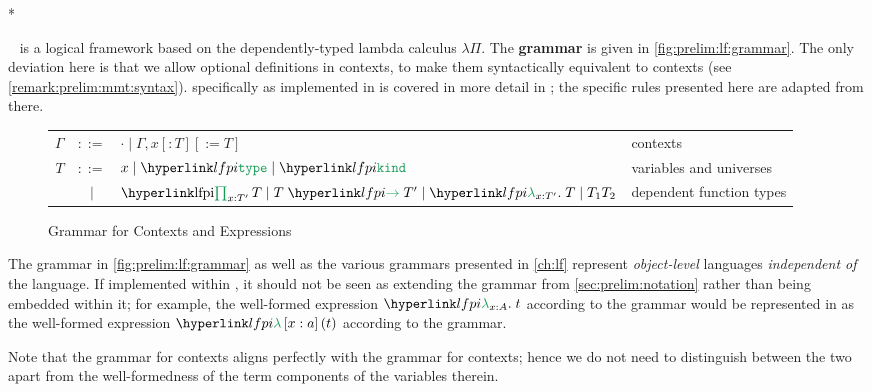 \lstMakeShortInline[language=scala]*

\LF~\cite{lf} is a logical framework based on the dependently-typed lambda calculus $\lambda\Pi$. \hypertarget{lfpi}{The \textbf{grammar} is given in \autoref{fig:prelim:lf:grammar}}.
The only deviation here is that we allow optional definitions in contexts, to make them syntactically equivalent to \mmt contexts (see \autoref{remark:prelim:mmt:syntax}). \LF specifically as implemented in \mmt is covered in more detail in \cite{rabe:recon:17}; the specific rules presented here are adapted from there.

\begin{figure}[ht]%
  \begin{framed}
      \begin{tabular}{rcl@{\quad}l}
        $\Gamma$ & $::=$ & $\cdot \mid \Gamma, x[:T][:=T]$ & contexts\\
	  	   $T$ & $::=$ & $x \mid \type \mid \kind $ & variables and universes\\
       		    & $\mid$ & $\lfpi{x:T'}T \mid \lfarrow{T}{T'} \mid \lflambda{x:T'}T \mid T_1 T_2$ & dependent function types
      \end{tabular}
\end{framed}
  \caption{Grammar for Contexts and Expressions}\label{fig:prelim:lf:grammar}%
\end{figure}

The grammar in \autoref{fig:prelim:lf:grammar} as well as the various grammars presented in \autoref{ch:lf} represent \emph{object-level} languages \emph{independent of} the \mmt language. If implemented within \mmt, it should not be seen as extending the \mmt grammar from \autoref{sec:prelim:notation} rather than being embedded within it; for example, the well-formed expression $\lflambda{x:A}t$ according to the \LF grammar would be represented in \ommt as the well-formed expression $\ombind{\lflambdasym}{x:a}t$ according to the \mmt grammar. 

Note that the grammar for contexts aligns perfectly with the grammar for \mmt contexts; hence we do not need to distinguish between the two apart from the well-formedness of the term components of the variables therein.


